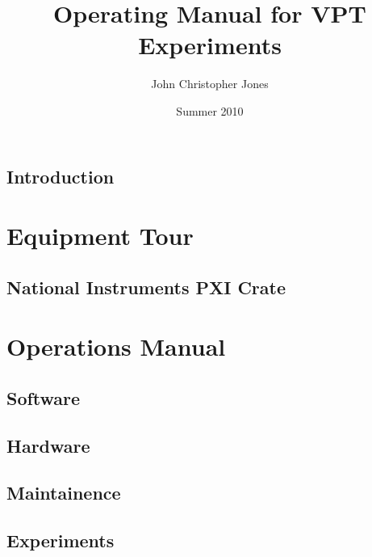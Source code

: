 \documentclass[10pt, onecolumn, oneside, article, letterpaper]{memoir}
\title{Operating Manual for VPT Experiments}
\author{John Christopher Jones}
\date{Summer 2010}
\begin{document}
\frontmatter

\tableofcontents
\listoffigures
\listoftables

\mainmatter

\chapter{Introduction}


\part{Equipment Tour}





\chapter{National Instruments PXI Crate}





\part{Operations Manual}

\chapter{Software}


\chapter{Hardware}





\chapter{Maintainence}


\chapter{Experiments}




\printglossaries



\backmatter
\end{document}
